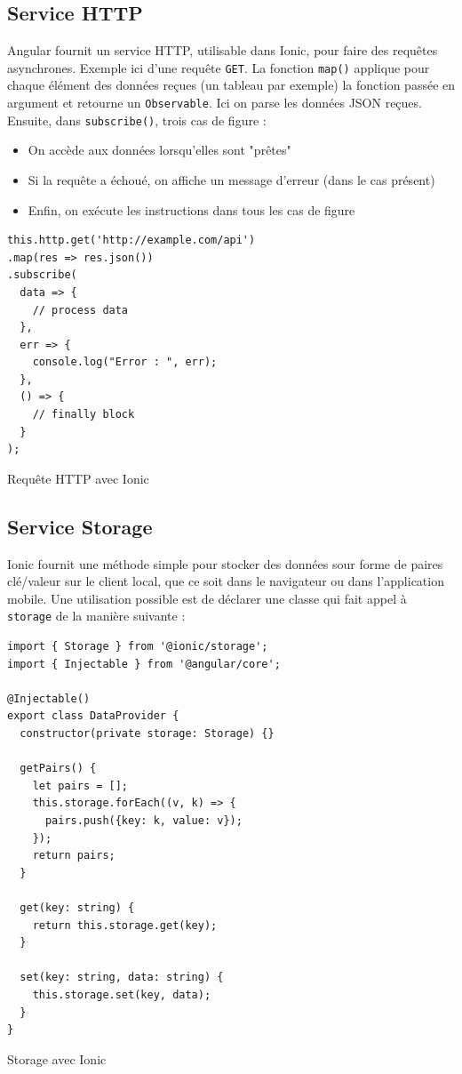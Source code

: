 \documentclass[a4paper, 12pt]{article}
\newenvironment{code}{\captionsetup{type=listing}}{}
\begin{document}
\subsection{Service HTTP}
Angular fournit un service HTTP, utilisable dans Ionic, pour faire des requêtes asynchrones. Exemple ici d'une
requête \texttt{GET}. La fonction \texttt{map()} applique pour chaque élément des données
reçues (un tableau par exemple) la fonction passée en argument et retourne un \texttt{Observable}.
Ici on parse les données JSON reçues. Ensuite, dans \texttt{subscribe()}, trois cas de figure :
\begin{itemize}
    \item On accède aux données lorsqu'elles sont "prêtes"
    \item Si la requête a échoué, on affiche un message d'erreur (dans le cas présent)
    \item Enfin, on exécute les instructions dans tous les cas de figure
\end{itemize}
\begin{code}
    \begin{verbatim}
this.http.get('http://example.com/api')
.map(res => res.json())
.subscribe(
  data => {
    // process data
  },
  err => {
    console.log("Error : ", err);
  },
  () => {
    // finally block
  }
);
    \end{verbatim}
    \caption{Requête HTTP avec Ionic}
\end{code}
\bigbreak

\subsection{Service Storage}
Ionic fournit une méthode simple pour stocker des données sour forme de paires clé/valeur sur le client local,
que ce soit dans le navigateur ou dans l'application mobile. Une utilisation possible est de déclarer une classe
qui fait appel à \texttt{storage} de la manière suivante \cite{ref70} :
\begin{code}
    \begin{verbatim}
import { Storage } from '@ionic/storage';
import { Injectable } from '@angular/core';

@Injectable()
export class DataProvider {
  constructor(private storage: Storage) {}

  getPairs() {
    let pairs = [];
    this.storage.forEach((v, k) => {
      pairs.push({key: k, value: v});
    });
    return pairs;
  }

  get(key: string) {
    return this.storage.get(key);
  }

  set(key: string, data: string) {
    this.storage.set(key, data);
  }
}
    \end{verbatim}
    \caption{Storage avec Ionic}
\end{code}
\bigbreak
\end{document}
